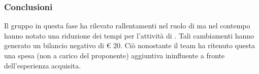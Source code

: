 		\subsubsection{Conclusioni}
			Il gruppo \groupname{} in questa fase ha rilevato rallentamenti nel ruolo di  ma nel contempo hanno notato una riduzione dei tempi per l'attività di . Tali cambiamenti hanno generato un bilancio negativo di \euro{} 20. Ciò nonostante il team ha ritenuto questa una spesa (non a carico del proponente) aggiuntiva ininfluente a fronte dell'esperienza acquisita. 
	
	
